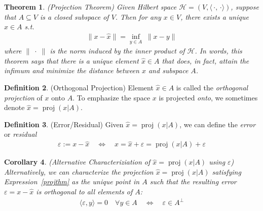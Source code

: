 \documentclass[12pt]{article}
\numberwithin{equation}{section} %
\theoremstyle{plain}
\newtheorem{thm}{Theorem}[section]
\newtheorem{cor}[thm]{Corollary}
\theoremstyle{definition}
\newtheorem{defn}[thm]{Definition}
\theoremstyle{remark}
\newcommand{\proj}{\operatorname{proj}}
\newcommand{\calH}{\mathcal{H}}
\begin{document}
\begin{thm}\emph{(Projection Theorem)}
Given Hilbert space $\calH=(V,\langle\,\cdot,\,\cdot\rangle)$,
suppose that $A\subseteq V$ is a \emph{closed} subspace of $V$.
Then for any $x\in V$, there exists a \emph{unique}
$\hat{x}\in A$ s.t.
\begin{align}
  \lVert x-\hat{x} \rVert =
  \inf_{y\in A} \; \lVert x-y\rVert
  \label{projthm}
\end{align}
where $\lVert\;\cdot\;\rVert$ is the norm induced by the inner product
of $\calH$. In words, this theorem says that there is a unique element
$\hat{x}\in A$ that does, in fact, attain the infimum and minimize the
distance between $x$ and subspace $A$.
\end{thm}

\begin{defn}(Orthogonal Projection)
Element $\hat{x}\in A$ is called the \emph{orthogonal projection} of
$x$ onto $A$. To emphasize the space $x$ is projected \emph{onto}, we
sometimes denote $\hat{x}=\proj(x|A)$.
\end{defn}

\begin{defn}(Error/Residual)
Given $\hat{x}=\proj(x|A)$, we can define the \emph{error} or
\emph{residual}
\begin{align*}
  \varepsilon:=x-\hat{x}
  \quad\iff\quad
  x=\hat{x}+\varepsilon=\proj(x|A)+\varepsilon
\end{align*}
\end{defn}

\begin{cor}
\emph{(Alternative Characteriziation of $\hat{x}=\proj(x|A)$ using
$\varepsilon$)}
Alternatively, we can characterize the projection $\hat{x}=\proj(x|A)$
satisfying Expression~\ref{projthm} as the unique point in $A$ such that
the resulting error $\varepsilon=x-\hat{x}$ is orthogonal to all
elements of $A$:
\begin{align*}
  \langle \varepsilon, y\rangle =0
  \quad\forall y\in A
  \quad\iff\quad
  \varepsilon\in A^\perp
\end{align*}
\end{cor}
\end{document}
